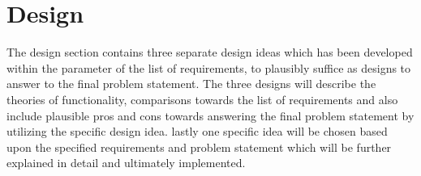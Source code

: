 \section{Design}
The design section contains three separate design ideas which has been developed within the parameter of the list of requirements, to plausibly suffice as designs to answer to the final problem statement. The three designs will describe the theories of functionality, comparisons towards the list of requirements and also include plausible pros and cons towards answering the final problem statement by utilizing the specific design idea.
lastly one specific idea will be chosen based upon the specified requirements and problem statement which will be further explained in detail and ultimately implemented. 







